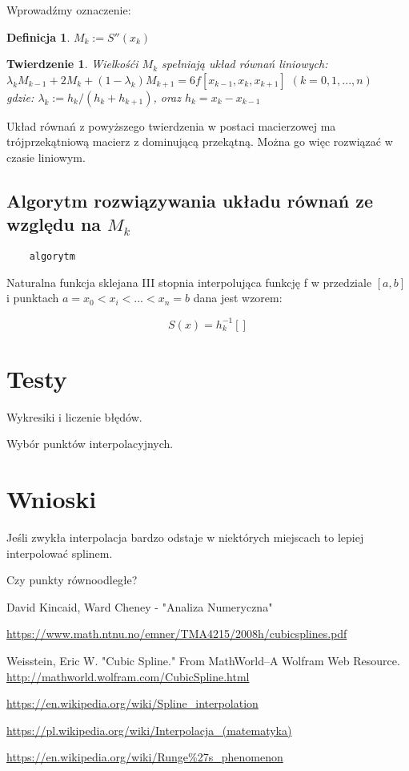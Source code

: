 \documentclass{article}
\newtheorem{defi}{Definicja}
\newtheorem{twr}{Twierdzenie}
\begin{document}
\noindent Wprowadźmy oznaczenie:

\begin{defi}
	$M_k := S''(x_k)$
\end{defi}

\begin{twr}
	Wielkośći $M_k$ spełniają układ równań liniowych:\\
	$\lambda_k M_{k-1} + 2M_k + (1-\lambda_k) M_{k+1} = 6f[x_{k-1},x_k,x_{k+1}]$ \hfill $(k=0,1,...,n)$\\
	gdzie: $\lambda_k := h_k / ( h_k + h_{k+1})$, oraz $h_k = x_k - x_{k-1}$
\end{twr}
	
Układ równań z powyższego twierdzenia w postaci macierzowej ma trójprzekątniową macierz z dominującą przekątną. Można go więc rozwiązać w czasie liniowym.

\subsection{Algorytm rozwiązywania układu równań ze względu na $M_k$}
\begin{verbatim}
	algorytm
\end{verbatim}

Naturalna funkcja sklejana III stopnia interpolująca funkcję f w przedziale $[a,b]$ i punktach $a = x_0 < x_i <...<x_n = b$ dana jest wzorem:

\begin{equation}
	S(x) = h_{k}^{-1}[]
\end{equation}




\section{Testy}
Wykresiki i liczenie błędów.

Wybór punktów interpolacyjnych.
	
	
\section{Wnioski}
Jeśli zwykła interpolacja bardzo odstaje w niektórych miejscach to lepiej interpolować splinem.

Czy punkty równoodległe?


\begin{thebibliography}{9}
	\itemsep2pt
			
	 David Kincaid, Ward Cheney - "Analiza Numeryczna"
	
	 \url{https://www.math.ntnu.no/emner/TMA4215/2008h/cubicsplines.pdf}
	
	 Weisstein, Eric W. "Cubic Spline." From MathWorld--A Wolfram Web Resource. \url{http://mathworld.wolfram.com/CubicSpline.html}
	
	 \url{https://en.wikipedia.org/wiki/Spline_interpolation}
	
	\url{https://pl.wikipedia.org/wiki/Interpolacja_(matematyka)}
	
	\url{https://en.wikipedia.org/wiki/Runge%27s_phenomenon}
	 
\end{thebibliography}
\end{document}
